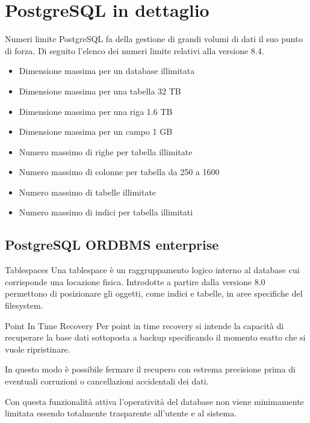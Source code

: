 \documentclass{beamer}
\begin{document}
\section{PostgreSQL in dettaglio}

\begin{frame}{Numeri limite}
 PostgreSQL fa della gestione di grandi volumi di dati il suo punto di forza. Di seguito l'elenco dei numeri limite relativi alla versione 8.4.

\begin{itemize}
\pause \item Dimensione massima per un database illimitata 
\pause \item Dimensione massima per una tabella 32 TB 
\pause \item Dimensione massima per una riga 1.6 TB 
\pause \item Dimensione massima per un campo 1 GB 
\pause \item Numero massimo di righe per tabella illimitate 
\pause \item Numero massimo di colonne per tabella da 250 a 1600 
\pause \item Numero massimo di tabelle illimitate
\pause \item Numero massimo di indici per tabella illimitati
\end{itemize}
\end{frame}

\subsection{PostgreSQL ORDBMS enterprise}

\begin{frame}{Tablespaces}
Una tablespace è un raggruppamento logico interno al database cui corrisponde una locazione fisica.
\newline
\pause Introdotte a partire dalla versione 8.0 permettono di posizionare gli oggetti, come indici e tabelle, in aree specifiche del filesystem.
\end{frame}

\begin{frame}{Point In Time Recovery}
Per point in time recovery si intende la capacità di recuperare la base dati sottoposta a backup specificando
il momento esatto che si vuole ripristinare.

\pause In questo modo è possibile fermare il recupero con estrema precisione prima di eventuali corruzioni o cancellazioni accidentali dei dati. \newline

\pause Con questa funzionalità attiva l'operatività del database non viene minimamente limitata essendo totalmente trasparente all'utente e al sistema.

\end{frame}
\end{document}

